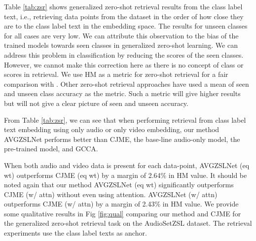 \documentclass[10pt,twocolumn,letterpaper]{article}
\begin{document}
 Table \ref{tab:zsr} shows generalized zero-shot retrieval results from the class label text, i.e., retrieving data points from the dataset in the order of how close they are to the class label text in the embedding space. The results for unseen classes for all cases are very low. We can attribute this observation to the bias of the trained models towards seen classes in generalized zero-shot learning. We can address this problem in classification by reducing the scores of the seen classes. However, we cannot make this correction here as there is no concept of class or scores in retrieval. We use HM as a metric for zero-shot retrieval for a fair comparison with \cite{parida2020coordinated}. Other zero-shot retrieval approaches have used a mean of seen and unseen class accuracy as the metric. Such a metric will give higher results but will not give a clear picture of seen and unseen accuracy.

From Table \ref{tab:zsr}, we can see that when performing retrieval from class label text embedding using only audio or only video embedding, our method AVGZSLNet performs better than CJME, the base-line audio-only model, the pre-trained model, and GCCA. 

When both audio and video data is present for each data-point, AVGZSLNet (eq wt) outperforms CJME (eq wt) by a margin of 2.64\% in HM value. It should be noted again that our method AVGZSLNet (eq wt) significantly outperforms CJME (w/ attn) without even using attention.  AVGZSLNet (w/ attn) outperforms CJME (w/ attn) by a margin of 2.43\% in HM value. We provide some qualitative results in Fig \ref{fig:qual} comparing our method and CJME for the generalized zero-shot retrieval task on the AudioSetZSL dataset. The retrieval experiments use the class label texts as anchor.
 
 \begin{table}[t]
 \centering
{}
 \caption{Ablation study to verify the contribution of $L_{REC}$, $L_{CTA}$ and $L_{CTV}$ components of $L_{CMD}$ on AVGZSLNet (eq wt) for generalized zero-shot classification (\% mAcc).}
 \label{tab:ablcmd}
\vspace{-15pt}
 \end{table}
 
\end{document}
